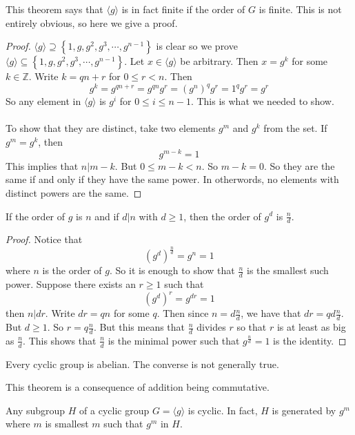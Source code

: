 \documentclass{article}
\begin{document}
This theorem says that $\langle g \rangle$ is in fact finite if the order of $G$ is finite. This is not entirely obvious, so here we give a proof.
\begin{proof}
    $\langle g \rangle\supseteq\left\{ 1, g, g^2,g^3,\cdots, g^{n-1} \right\}$ is clear so we prove $\langle g \rangle\subseteq\left\{ 1, g, g^2,g^3,\cdots, g^{n-1} \right\}$. 
    Let $x\in \langle g \rangle$ be arbitrary. Then $x=g^k$ for some $k\in \mathbb{Z}$. Write $k=qn+r$ for $0\leq r < n$. Then 
    \[
    g^k = g^{qn+r}=g^{qn}g^r= (g^n)^qg^r= 1^qg^r=g^r
    \]
    So any element in $\langle g \rangle$ is $g^i$ for $0\leq i \leq n-1$. This is what we needed to show. 
    \\\\
    To show that they are distinct, take two elements $g^m$ and $g^k$ from the set. If $g^m =g^k$, then
    \[
    g^{m-k}=1
    \]
    This implies that $n|m-k$. But $0\leq m-k < n$. So $m-k=0$. So they are the same if and only if they have the same power. 
    In otherwords, no elements with distinct powers are the same.
\end{proof}
\begin{theorem}
    If the order of $g$ is $n$ and if $d|n$ with $d\geq 1$, then the order of $g^d$ is $\frac{n}{d}$.
\end{theorem}
\begin{proof}
    Notice that
    \[
    (g^d)^{\frac{n}{d}}=g^n=1
    \]
    where $n$ is the order of $g$. So it is enough to show that $\frac{n}{d}$ is the smallest such power. Suppose there exists
    an $r\geq 1$ such that
    \[
    (g^d)^r=g^{dr}=1
    \]
    then $n|dr$. Write $dr=qn$ for some $q$. Then since $n=d\frac{n}{d}$, we have that $dr =qd\frac{n}{d}$. But $d\geq 1$. So $r=q\frac{n}{d}$. But this means that $\frac{n}{d}$ divides $r$ so 
    that $r$ is at least as big as $\frac{n}{d}$. This shows that $\frac{n}{d}$ is the minimal power such that $g^{\frac{n}{d}}=1$ is the identity.
\end{proof}
\begin{theorem}
    Every cyclic group is abelian. The converse is not generally true.
\end{theorem}
This theorem is a consequence of addition being commutative.
\begin{theorem}
    Any subgroup $H$ of a cyclic group $G = \langle g \rangle$ is cyclic. In fact, $H$ is generated by $g^m$ where $m$ is smallest $m$ such that 
    $g^m$ in $H$.
\end{theorem}
\end{document}
